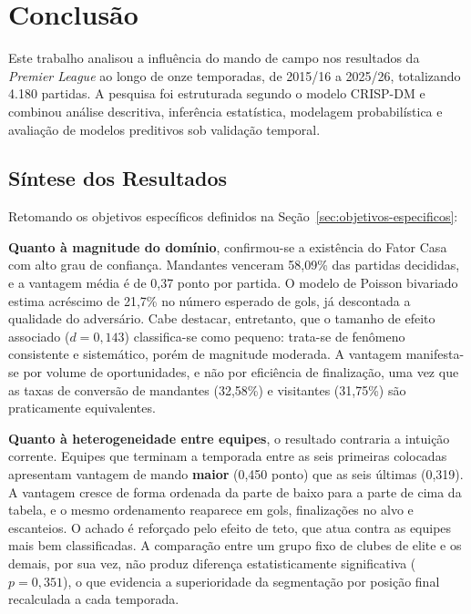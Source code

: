 
\chapter{Conclusão}\label{cap:conclusao}

Este trabalho analisou a influência do mando de campo nos resultados da
\textit{Premier League} ao longo de onze temporadas, de 2015/16 a 2025/26,
totalizando 4.180 partidas. A pesquisa foi estruturada segundo o modelo
CRISP-DM e combinou análise descritiva, inferência estatística, modelagem
probabilística e avaliação de modelos preditivos sob validação temporal.

\section{Síntese dos Resultados}\label{sec:sintese}

Retomando os objetivos específicos definidos na Seção~\ref{sec:objetivos-especificos}:

\textbf{Quanto à magnitude do domínio}, confirmou-se a existência do Fator Casa
com alto grau de confiança. Mandantes venceram 58,09\% das partidas decididas, e
a vantagem média é de 0,37 ponto por partida. O modelo de Poisson bivariado
estima acréscimo de 21,7\% no número esperado de gols, já descontada a qualidade
do adversário. Cabe destacar, entretanto, que o tamanho de efeito associado
($d = 0{,}143$) classifica-se como pequeno: trata-se de fenômeno consistente e
sistemático, porém de magnitude moderada. A vantagem manifesta-se por volume de
oportunidades, e não por eficiência de finalização, uma vez que as taxas de
conversão de mandantes (32,58\%) e visitantes (31,75\%) são praticamente
equivalentes.

\textbf{Quanto à heterogeneidade entre equipes}, o resultado contraria a
intuição corrente. Equipes que terminam a temporada entre as seis primeiras
colocadas apresentam vantagem de mando \textbf{maior} (0,450 ponto) que as seis
últimas (0,319). A vantagem cresce de forma ordenada da parte de baixo para a
parte de cima da tabela, e o mesmo ordenamento reaparece em gols, finalizações
no alvo e escanteios. O achado é reforçado pelo efeito de teto, que atua contra as
equipes mais bem classificadas. A comparação entre um grupo fixo de clubes de
elite e os demais, por sua vez, não produz diferença estatisticamente
significativa ($p = 0{,}351$), o que evidencia a superioridade da segmentação
por posição final recalculada a cada temporada.

